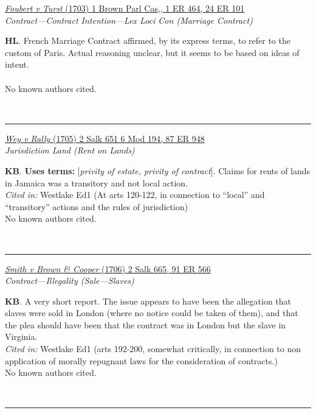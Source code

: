 \documentclass[twoside]{article}
\begin{document}
        \begin{small}
        \begin{center}
        \href{https://heinonline.org/HOL/P?h=hein.engrep/engra0001&i=472}{\textit{Foubert v Turst} (1703) 1 Brown Parl Cas,, 1 ER 464,  24 ER 101} \label{27} \\ 
\textit{Contract---Contract Intention---Lex Loci Con (Marriage Contract)}\\
        \end{center}
        \textbf{HL}. French Marriage Contract affirmed, by its express terms, to refer to the custom of Paris. Actual reasoning unclear, but it seems to be based on ideas of intent.\\\\No known authors cited.
        \end{small}\\
        \rule{\textwidth}{0.5pt}
        

        \begin{small}
        \begin{center}
        \href{https://heinonline.org/HOL/P?h=hein.engrep/engrf0087&i=952}{\textit{Wey v Rally} (1705) 2 Salk 651 6 Mod 194, 87 ER 948} \label{14} \\ 
\textit{Jurisdiction Land (Rent on Lands)}\\
        \end{center}
        \textbf{KB}.  \textbf{Uses terms: }[\textit{privity of estate, privity of contract}]. Claims for rents of lands in Jamaica was a transitory and not local action.\\\textit{Cited in: }Westlake Ed1 (At arts 120-122, in connection to “local” and “transitory” actions and the rules of jurisdiction)\\No known authors cited.
        \end{small}\\
        \rule{\textwidth}{0.5pt}
        

        \begin{small}
        \begin{center}
        \href{https://heinonline.org/HOL/P?h=hein.engrep/engrf0091&i=570}{\textit{Smith v Brown \& Cooper} (1706) 2 Salk 665, 91 ER 566} \label{29} \\ 
\textit{Contract---Illegality (Sale---Slaves)}\\
        \end{center}
        \textbf{KB}. A very short report. The issue appears to have been the allegation that slaves were sold in London (where no notice could be taken of them), and that the plea should have been that the contract was in London but the slave in Virginia.\\\textit{Cited in: }Westlake Ed1 (arts 192-200, somewhat critically, in connection to non application of morally repugnant laws for the consideration of contracts.)\\No known authors cited.
        \end{small}\\
        \rule{\textwidth}{0.5pt}
        
\end{document}
